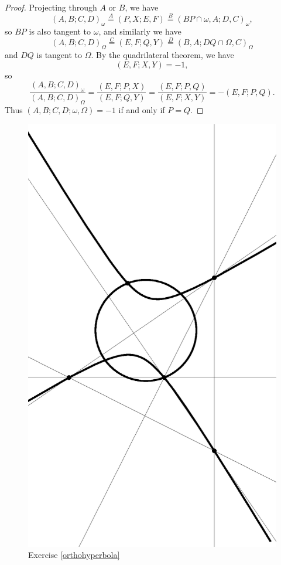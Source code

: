 \documentclass[letterpaper,11pt]{article}
\theoremstyle{definition}
\theoremstyle{remark}
\begin{document}
\begin{proof}
Projecting through $A$ or $B$, we have
\[
(A,B;C,D)_\omega \stackrel{A}{=} (P,X;E,F) \stackrel{B}{=} (BP\cap\omega,A;D,C)_\omega,
\]
so $BP$ is also tangent to $\omega$, and similarly we have
\[
(A,B;C,D)_\Omega \stackrel{C}{=} (E,F;Q,Y) \stackrel{D}{=} (B,A;DQ\cap\Omega,C)_\Omega
\]
and $DQ$ is tangent to $\Omega$. By the quadrilateral theorem, we have
\[
(E,F;X,Y) = -1,
\]
so
\[
\frac{(A,B;C,D)_\omega}{(A,B;C,D)_\Omega} = \frac{(E,F;P,X)}{(E,F;Q,Y)} = \frac{(E,F;P,Q)}{(E,F;X,Y)} = -(E,F;P,Q).
\]
Thus $(A,B;C,D;\omega,\Omega) = -1$ if and only if $P = Q$.
\end{proof}

\begin{figure}[!htb]
\centering
\includegraphics[scale=0.5,angle=270]{righthyperbola.eps}
\caption{Exercise \ref{orthohyperbola}}\label{righthyperbola}
\end{figure}
\end{document}
